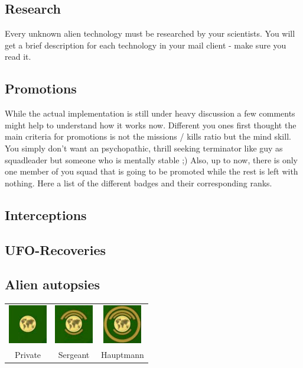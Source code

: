 \subsection{Research}
Every unknown alien technology must be researched by your scientists. You will get a brief description for each technology in your mail client - make sure you read it.

\subsection{Promotions}
While the actual implementation is still under heavy discussion a few comments might help to understand how it works now. Different you ones first thought the main criteria for promotions is not the missions / kills ratio but the mind skill. You simply don't want an psychopathic, thrill seeking terminator like guy as squadleader but someone who is mentally stable ;) Also, up to now, there is only one member of you squad that is going to be promoted while the rest is left with nothing.
Here a list of the different badges and their corresponding ranks.

\subsection{Interceptions}

\subsection{UFO-Recoveries}

\subsection{Alien autopsies}

\begin{tabular}{ccc}
\includegraphics[scale=1]{images/badges_rekrut_final.jpg} & \includegraphics[scale=1]{images/badges_sergeant_final.jpg} & \includegraphics[scale=1]{images/badges_hauptmann_final.jpg}\\
Private & Sergeant & Hauptmann\\
\end{tabular} 
